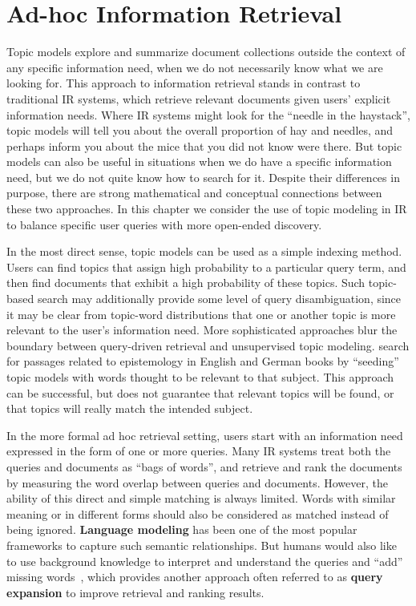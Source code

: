 \chapter{Ad-hoc Information Retrieval}
\label{ch:ir}

Topic models explore and summarize document collections outside the context of any specific information need, when we do not necessarily know what we are looking for.
This approach to information retrieval stands in contrast to traditional IR systems, which retrieve relevant documents given users' explicit information needs.
Where IR systems might look for the ``needle in the haystack'', topic models will tell you about the overall proportion of hay and needles, and perhaps inform you about the mice that you did not know were there.
But topic models can also be useful in situations when we do have a specific information need, but we do not quite know how to search for it.
Despite their differences in purpose, there are strong mathematical and conceptual connections between these two approaches.
In this chapter we consider the use of topic modeling in IR to balance specific user queries with more open-ended discovery.

In the most direct sense, topic models can be used as a simple indexing method.
Users can find topics that assign high probability to a particular query term, and then find documents that exhibit a high probability of these topics.
Such topic-based search may additionally provide some level of query disambiguation, since it may be clear from topic-word distributions that one or another topic is more relevant to the user's information need.
More sophisticated approaches blur the boundary between query-driven retrieval and unsupervised topic modeling.
\citet{erlin2017topic} search for passages related to epistemology in English and German books by ``seeding'' topic models with words thought to be relevant to that subject.
This approach can be successful, but does not guarantee that relevant topics will be found, or that topics will really match the intended subject.

In the more formal ad hoc retrieval setting, users start with an information need expressed in the form of one or more queries. Many IR systems treat both the queries and documents as ``bags of words'', and retrieve and rank the documents by measuring the word overlap between queries and documents.
However, the ability of this direct and simple matching is always
limited. Words with similar meaning or in different forms should also
be considered as matched instead of being ignored. \textbf{Language
  modeling} has been one of the most popular frameworks to capture
such semantic relationships. But humans would also like to use background
knowledge to interpret and understand the queries and ``add'' missing
words~\citep{wei-07}, which provides another approach often referred to as
\textbf{query expansion} to improve retrieval and ranking results.

